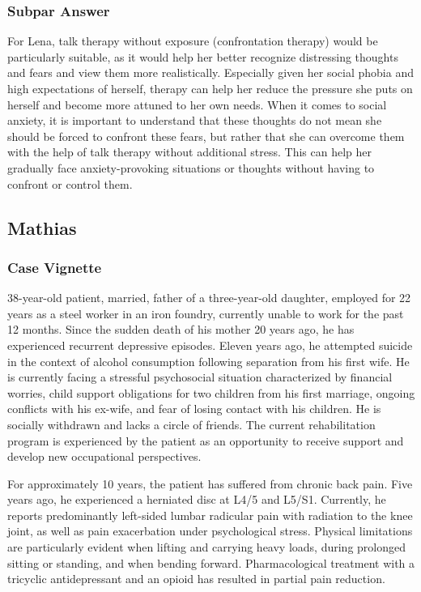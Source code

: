\subsubsection{Subpar Answer}
For Lena, talk therapy without exposure (confrontation therapy) would be particularly suitable, as it would help her better recognize distressing thoughts and fears and view them more realistically.
Especially given her social phobia and high expectations of herself, therapy can help her reduce the pressure she puts on herself and become more attuned to her own needs.
When it comes to social anxiety, it is important to understand that these thoughts do not mean she should be forced to confront these fears, but rather that she can overcome them with the help of talk therapy without additional stress.
This can help her gradually face anxiety-provoking situations or thoughts without having to confront or control them.

\subsection{Mathias \autocite[p~1]{bar_fallbeispiel_psyche_psychosomatik}}
\label{app:MathiasFull}
\subsubsection{Case Vignette}
38-year-old patient, married, father of a three-year-old daughter, employed for 22 years as a steel worker in an iron foundry, currently unable to work for the past 12 months.
Since the sudden death of his mother 20 years ago, he has experienced recurrent depressive episodes.
Eleven years ago, he attempted suicide in the context of alcohol consumption following separation from his first wife.
He is currently facing a stressful psychosocial situation characterized by financial worries, child support obligations for two children from his first marriage, ongoing conflicts with his ex-wife, and fear of losing contact with his children.
He is socially withdrawn and lacks a circle of friends.
The current rehabilitation program is experienced by the patient as an opportunity to receive support and develop new occupational perspectives.

For approximately 10 years, the patient has suffered from chronic back pain.
Five years ago, he experienced a herniated disc at L4/5 and L5/S1.
Currently, he reports predominantly left-sided lumbar radicular pain with radiation to the knee joint, as well as pain exacerbation under psychological stress.
Physical limitations are particularly evident when lifting and carrying heavy loads, during prolonged sitting or standing, and when bending forward.
Pharmacological treatment with a tricyclic antidepressant and an opioid has resulted in partial pain reduction.

